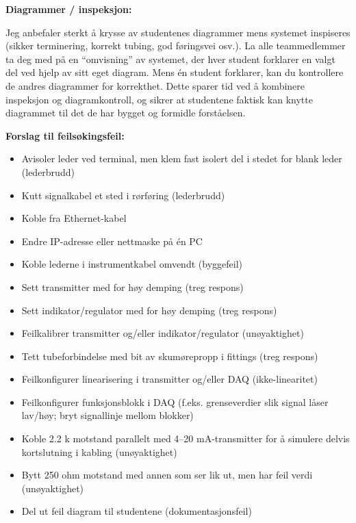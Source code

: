





\noindent
{\bf Diagrammer / inspeksjon:}

Jeg anbefaler sterkt å krysse av studentenes diagrammer mens systemet inspiseres (sikker terminering, korrekt tubing, god føringsvei osv.). La alle teammedlemmer ta deg med på en ``omvisning'' av systemet, der hver student forklarer en valgt del ved hjelp av sitt eget diagram. Mens én student forklarer, kan du kontrollere de andres diagrammer for korrekthet. Dette sparer tid ved å kombinere inspeksjon og diagramkontroll, og sikrer at studentene faktisk kan knytte diagrammet til det de har bygget og formidle forståelsen.

\vskip 10pt

\goodbreak

\noindent
{\bf Forslag til feilsøkingsfeil:}

\begin{itemize}
\goodbreak
\item{} Avisoler leder ved terminal, men klem fast isolert del i stedet for blank leder (lederbrudd)
\item{} Kutt signalkabel et sted i rørføring (lederbrudd)
\item{} Koble fra Ethernet-kabel
\item{} Endre IP-adresse eller nettmaske på én PC
\item{} Koble lederne i instrumentkabel omvendt (byggefeil)
\item{} Sett transmitter med for høy demping (treg respons)
\item{} Sett indikator/regulator med for høy demping (treg respons)
\item{} Feilkalibrer transmitter og/eller indikator/regulator (unøyaktighet)
\item{} Tett tubeforbindelse med bit av skumørepropp i fittings (treg respons)
\item{} Feilkonfigurer linearisering i transmitter og/eller DAQ (ikke-linearitet)
\item{} Feilkonfigurer funksjonsblokk i DAQ (f.eks. grenseverdier slik signal låser lav/høy; bryt signallinje mellom blokker)
\item{} Koble 2.2 k motstand parallelt med 4--20 mA-transmitter for å simulere delvis kortslutning i kabling (unøyaktighet)
\item{} Bytt 250 ohm motstand med annen som ser lik ut, men har feil verdi (unøyaktighet)
\item{} Del ut feil diagram til studentene (dokumentasjonsfeil)
\end{itemize}













